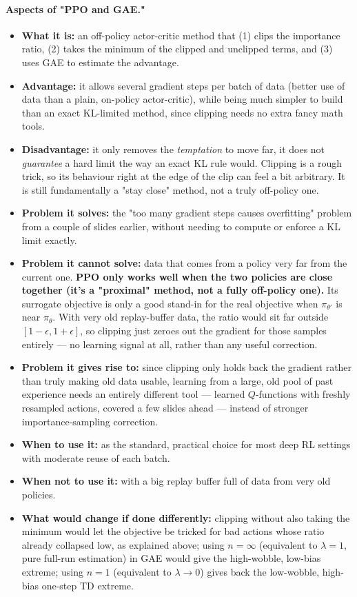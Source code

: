 \documentclass[11pt]{article}
\begin{document}
\paragraph{Aspects of "PPO and GAE."}
\begin{itemize}[leftmargin=*]
  \item \textbf{What it is:} an off-policy actor-critic method that (1) clips the importance ratio, (2) takes the minimum of the clipped and unclipped terms, and (3) uses GAE to estimate the advantage.
  \item \textbf{Advantage:} it allows several gradient steps per batch of data (better use of data than a plain, on-policy actor-critic), while being much simpler to build than an exact KL-limited method, since clipping needs no extra fancy math tools.
  \item \textbf{Disadvantage:} it only removes the \emph{temptation} to move far, it does not \emph{guarantee} a hard limit the way an exact KL rule would. Clipping is a rough trick, so its behaviour right at the edge of the clip can feel a bit arbitrary. It is still fundamentally a "stay close" method, not a truly off-policy one.
  \item \textbf{Problem it solves:} the "too many gradient steps causes overfitting" problem from a couple of slides earlier, without needing to compute or enforce a KL limit exactly.
  \item \textbf{Problem it cannot solve:} data that comes from a policy very far from the current one. \textbf{PPO only works well when the two policies are close together (it's a "proximal" method, not a fully off-policy one).} Its surrogate objective is only a good stand-in for the real objective when $\pi_{\theta'}$ is near $\pi_\theta$. With very old replay-buffer data, the ratio would sit far outside $[1-\epsilon,1+\epsilon]$, so clipping just zeroes out the gradient for those samples entirely --- no learning signal at all, rather than any useful correction.
  \item \textbf{Problem it gives rise to:} since clipping only holds back the gradient rather than truly making old data usable, learning from a large, old pool of past experience needs an entirely different tool --- learned $Q$-functions with freshly resampled actions, covered a few slides ahead --- instead of stronger importance-sampling correction.
  \item \textbf{When to use it:} as the standard, practical choice for most deep RL settings with moderate reuse of each batch.
  \item \textbf{When not to use it:} with a big replay buffer full of data from very old policies.
  \item \textbf{What would change if done differently:} clipping without also taking the minimum would let the objective be tricked for bad actions whose ratio already collapsed low, as explained above; using $n=\infty$ (equivalent to $\lambda=1$, pure full-run estimation) in GAE would give the high-wobble, low-bias extreme; using $n=1$ (equivalent to $\lambda\to0$) gives back the low-wobble, high-bias one-step TD extreme.
\end{itemize}
\end{document}
